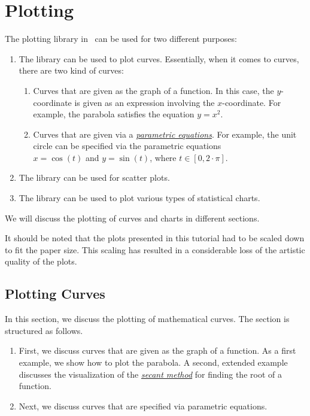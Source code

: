 \chapter{Plotting}
The plotting library in \setlx\ can be used for two different purposes:
\begin{enumerate}
\item The library can be used to plot curves.  Essentially, when it comes to curves, there are two kind of curves:
      \begin{enumerate}
      \item Curves that are given as the graph of a function.  In this case, the $y$-coordinate is
            given as an expression involving the $x$-coordinate.  For example, the parabola
            satisfies the equation $y = x^2$. 
      \item Curves that are given via a 
            \href{https://en.wikipedia.org/wiki/Parametric_equation}{\emph{parametric equations}}.
            For example, the unit circle can be specified via the parametric equations 
            \\[0.2cm]
            \hspace*{1.3cm}
            $x = \cos(t)$ \quad and \quad $y = \sin(t)$, \quad where $t \in [0, 2 \cdot \pi]$.
      \end{enumerate}
\item The library can be used for scatter plots.
\item The library can be used to plot various types of statistical charts. 
\end{enumerate}
We will discuss the plotting of curves and charts in different sections.

It should be noted that the plots presented in this tutorial had to be scaled down to fit the paper
size.  This scaling has resulted in a considerable loss of the artistic quality of the plots.

\section{Plotting Curves}
In this section, we discuss the plotting of mathematical curves.  The section is structured as
follows.
\begin{enumerate}
\item First, we discuss curves that are given as the graph of a function.
      As a first example, we show how to plot the parabola.  A second, extended example discusses
      the visualization of the \href{https://en.wikipedia.org/wiki/Secant_method}{\emph{secant method}}
      for finding the root of a function.
\item Next, we discuss curves that are specified via parametric equations.
\end{enumerate}
